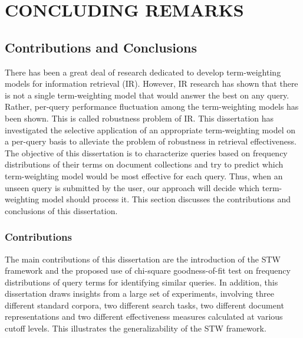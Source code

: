%
%
%




\chapter{\textbf{CONCLUDING REMARKS}}
\label{ch9}

\section{Contributions and Conclusions}

There has been a great deal of research dedicated to develop term-weighting models for information retrieval (IR). 
However, IR research has shown that there is not a single term-weighting model that would answer the best on any query.
Rather, per-query performance fluctuation among the term-weighting models has been shown.
This is called robustness problem of IR.
This dissertation has investigated the selective application of an appropriate term-weighting model on a per-query basis to alleviate the problem of robustness in retrieval effectiveness.
The objective of this dissertation is to characterize queries based on frequency distributions of their terms on document collections and try to predict which term-weighting model would be most effective for each query.
Thus, when an unseen query is submitted by the user, our approach will decide which term-weighting model should process it.
This section discusses the contributions and conclusions of this dissertation.

\subsection{Contributions}
The main contributions of this dissertation are the introduction of the STW framework and the proposed use of chi-square goodness-of-fit test  
on frequency distributions of query terms for identifying similar queries.
In addition, this dissertation draws insights from a large set of experiments, involving three different standard corpora, two different search tasks, two different document representations and two different effectiveness measures calculated at various cutoff levels.
This illustrates the generalizability of the STW framework.

